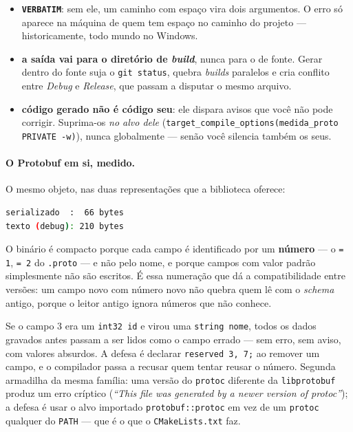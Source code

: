 \begin{armadilha}
\begin{itemize}
    \item \textbf{\texttt{VERBATIM}}: sem ele, um caminho com espaço vira dois
          argumentos. O erro só aparece na máquina de quem tem espaço no caminho
          do projeto --- historicamente, todo mundo no Windows.
    \item \textbf{a saída vai para o diretório de \emph{build}}, nunca para o de
          fonte. Gerar dentro do fonte suja o \texttt{git status}, quebra
          \emph{builds} paralelos e cria conflito entre \emph{Debug} e
          \emph{Release}, que passam a disputar o mesmo arquivo.
    \item \textbf{código gerado não é código seu}: ele dispara avisos que você
          não pode corrigir. Suprima-os \emph{no alvo dele}
          (\texttt{target\_compile\_options(medida\_proto PRIVATE -w)}), nunca
          globalmente --- senão você silencia também os seus.
\end{itemize}
\end{armadilha}

\paragraph{O Protobuf em si, medido.} O mesmo objeto, nas duas
representações que a biblioteca oferece:

\begin{lstlisting}[style=bt, language=bash,
    caption={Saída de \texttt{./build/cmake\_guia} nesta máquina.}]
serializado  :  66 bytes
texto (debug): 210 bytes
\end{lstlisting}

O binário é compacto porque cada campo é identificado por um \textbf{número}
--- o \texttt{= 1}, \texttt{= 2} do \texttt{.proto} --- e não pelo nome, e
porque campos com valor padrão simplesmente não são escritos. É essa numeração
que dá a compatibilidade entre versões: um campo novo com número novo não quebra
quem lê com o \emph{schema} antigo, porque o leitor antigo ignora números que
não conhece.

\begin{armadilha}
Se o campo 3 era um \texttt{int32 id} e virou uma \texttt{string nome}, todos os
dados gravados antes passam a ser lidos como o campo errado --- sem erro, sem
aviso, com valores absurdos. A defesa é declarar
\texttt{reserved 3, 7;} ao remover um campo, e o compilador passa a recusar
quem tentar reusar o número. Segunda armadilha da mesma família: uma versão do
\texttt{protoc} diferente da \texttt{libprotobuf} produz um erro críptico
(\emph{``This file was generated by a newer version of protoc''}); a defesa é
usar o alvo importado \texttt{protobuf::protoc} em vez de um \texttt{protoc}
qualquer do \texttt{PATH} --- que é o que o \texttt{CMakeLists.txt} faz.
\end{armadilha}

